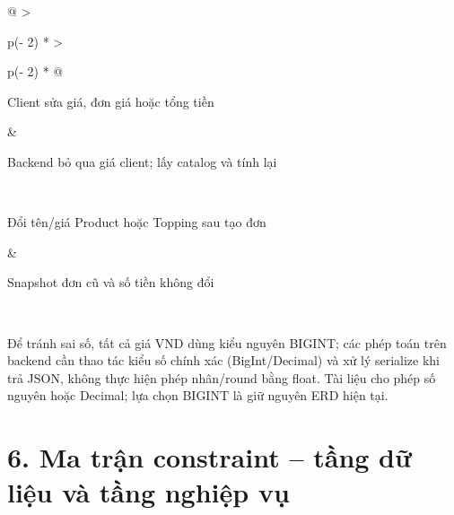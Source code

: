 \documentclass[11pt,a4paper,oneside]{report}
\begin{document}
\begin{longtable}[]{@{}
  >{\raggedright\arraybackslash}p{(\columnwidth - 2\tabcolsep) * }
  >{\raggedright\arraybackslash}p{(\columnwidth - 2\tabcolsep) * }@{}}
\begin{minipage}[b]{\linewidth}
Client sửa giá, đơn giá hoặc tổng tiền
\end{minipage} & \begin{minipage}[b]{\linewidth}\raggedright
Backend bỏ qua giá client; lấy catalog và tính lại
\end{minipage} \\
\begin{minipage}[b]{\linewidth}\raggedright
Đổi tên/giá Product hoặc Topping sau tạo đơn
\end{minipage} & \begin{minipage}[b]{\linewidth}\raggedright
Snapshot đơn cũ và số tiền không đổi
\end{minipage} \\
\midrule\noalign{}
\endhead
\bottomrule\noalign{}
\endlastfoot
\end{longtable}

Để tránh sai số, tất cả giá VND dùng kiểu nguyên BIGINT; các phép toán trên backend cần thao tác kiểu số chính xác (BigInt/Decimal) và xử lý serialize khi trả JSON, không thực hiện phép nhân/round bằng float. Tài liệu cho phép số nguyên hoặc Decimal; lựa chọn BIGINT là giữ nguyên ERD hiện tại.

\section{6. Ma trận constraint -- tầng dữ liệu và tầng nghiệp vụ}\label{06-product-data-model:ma-trux1eadn-constraint-tux1ea7ng-dux1eef-liux1ec7u-vuxe0-tux1ea7ng-nghiux1ec7p-vux1ee5}
\end{document}
